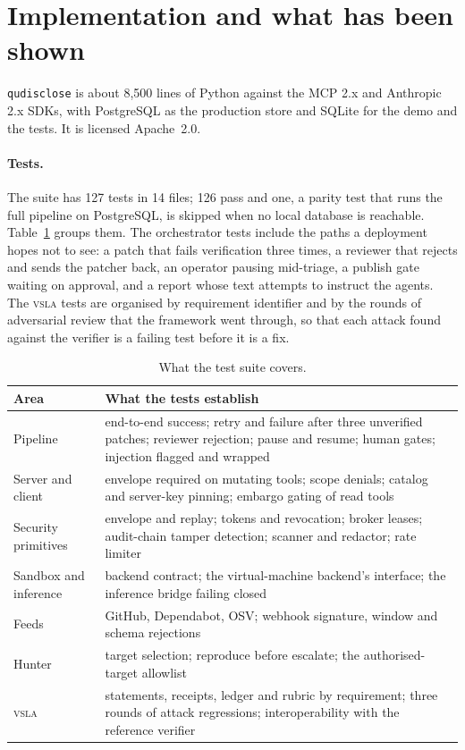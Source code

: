 \documentclass[11pt]{article}
\newcommand{\qud}{\texttt{qudisclose}}
\newcommand{\vsla}{\textsc{vsla}}
\begin{document}
\section{Implementation and what has been shown}
\label{sec:eval}

\qud{} is about 8{,}500 lines of Python against the MCP 2.x and Anthropic 2.x SDKs, with PostgreSQL as the
production store and SQLite for the demo and the tests. It is licensed Apache~2.0.

\paragraph{Tests.} The suite has 127 tests in 14 files; 126 pass and one, a parity test that runs the full
pipeline on PostgreSQL, is skipped when no local database is reachable. Table~\ref{tab:tests} groups them. The
orchestrator tests include the paths a deployment hopes not to see: a patch that fails verification three
times, a reviewer that rejects and sends the patcher back, an operator pausing mid-triage, a publish gate
waiting on approval, and a report whose text attempts to instruct the agents. The \vsla{} tests are organised
by requirement identifier and by the rounds of adversarial review that the framework went through, so that each
attack found against the verifier is a failing test before it is a fix.

\begin{table}[t]
\centering\small
\begin{tabular}{@{}l>{\raggedright\arraybackslash}p{}@{}}
\toprule
Area & What the tests establish \\
\midrule
Pipeline & end-to-end success; retry and failure after three unverified patches; reviewer rejection; pause and resume; human gates; injection flagged and wrapped \\
Server and client & envelope required on mutating tools; scope denials; catalog and server-key pinning; embargo gating of read tools \\
Security primitives & envelope and replay; tokens and revocation; broker leases; audit-chain tamper detection; scanner and redactor; rate limiter \\
Sandbox and inference & backend contract; the virtual-machine backend's interface; the inference bridge failing closed \\
Feeds & GitHub, Dependabot, OSV; webhook signature, window and schema rejections \\
Hunter & target selection; reproduce before escalate; the authorised-target allowlist \\
\vsla{} & statements, receipts, ledger and rubric by requirement; three rounds of attack regressions; interoperability with the reference verifier \\
\bottomrule
\end{tabular}
\caption{What the test suite covers.}
\label{tab:tests}
\end{table}
\end{document}
